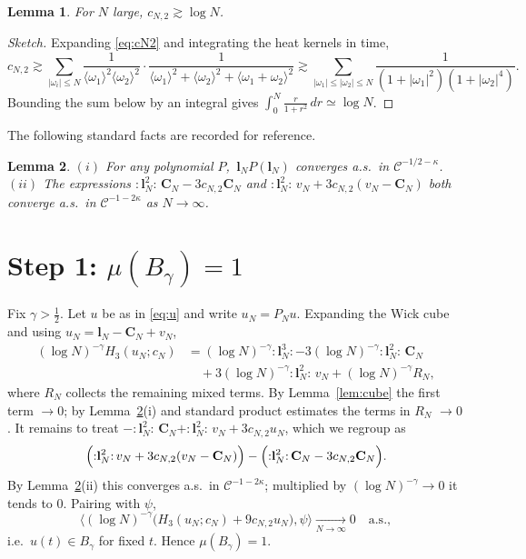 \documentclass[11pt]{article}
\newcommand{\C}{\mathcal{C}}
\newcommand{\Hp}{H}      %
\newcommand{\PN}{P_N}
\newcommand{\Lin}{\mathbf{l}}   %
\newcommand{\Iqc}{\mathbf{C}}   %
\newtheorem{lemma}{Lemma}
\begin{document}
\begin{lemma}\label{lem:logdiv}
For $N$ large, $c_{N,2}\gtrsim\log N$.
\end{lemma}

\begin{proof}[Sketch]
Expanding \eqref{eq:cN2} and integrating the heat kernels in time,
\[
c_{N,2}\gtrsim\sum_{|\omega_i|\le N}\frac{1}{\langle\omega_1\rangle^2\langle\omega_2\rangle^2}\cdot\frac{1}{\langle\omega_1\rangle^2+\langle\omega_2\rangle^2+\langle\omega_1+\omega_2\rangle^2}
\gtrsim\sum_{|\omega_1|\le|\omega_2|\le N}\frac{1}{(1+|\omega_1|^2)(1+|\omega_2|^4)}.
\]
Bounding the sum below by an integral gives
$\int_0^N\frac{r}{1+r^2}\,dr\simeq\log N$.
\end{proof}

The following standard facts are recorded for reference.

\begin{lemma}\label{lem:std}
$(i)$ For any polynomial $P$, $\,\Lin_N P(\Lin_N)$ converges a.s.\ in
$\C^{-1/2-\kappa}$. $(ii)$ The expressions ${:}\Lin_N^2{:}\,\Iqc_N-3c_{N,2}\Iqc_N$
and ${:}\Lin_N^2{:}\,v_N+3c_{N,2}(v_N-\Iqc_N)$ both converge a.s.\ in
$\C^{-1-2\kappa}$ as $N\to\infty$.
\end{lemma}

\section*{Step 1: $\mu(B_\gamma)=1$}

Fix $\gamma>\tfrac12$. Let $u$ be as in \eqref{eq:u} and write $u_N=\PN u$.
Expanding the Wick cube and using $u_N=\Lin_N-\Iqc_N+v_N$,
\begin{align*}
(\log N)^{-\gamma}\Hp_3(u_N;c_N)
&=(\log N)^{-\gamma}{:}\Lin_N^3{:}
-3(\log N)^{-\gamma}{:}\Lin_N^2{:}\,\Iqc_N\\
&\quad+3(\log N)^{-\gamma}{:}\Lin_N^2{:}\,v_N
+(\log N)^{-\gamma}R_N,
\end{align*}
where $R_N$ collects the remaining mixed terms. By Lemma~\ref{lem:cube} the
first term $\to0$; by Lemma~\ref{lem:std}(i) and standard product estimates the
terms in $R_N$ $\to0$. It remains to treat
$-{:}\Lin_N^2{:}\,\Iqc_N+{:}\Lin_N^2{:}\,v_N+3c_{N,2}u_N$, which we regroup as
\[
\Bigl({:}\Lin_N^2{:}\,v_N+3c_{N,2}(v_N-\Iqc_N)\Bigr)-\Bigl({:}\Lin_N^2{:}\,\Iqc_N-3c_{N,2}\Iqc_N\Bigr).
\]
By Lemma~\ref{lem:std}(ii) this converges a.s.\ in $\C^{-1-2\kappa}$; multiplied
by $(\log N)^{-\gamma}\to0$ it tends to $0$. Pairing with $\psi$,
\[
\bigl\langle(\log N)^{-\gamma}\bigl(\Hp_3(u_N;c_N)+9c_{N,2}u_N\bigr),\psi\bigr\rangle\xrightarrow[N\to\infty]{}0\quad\text{a.s.},
\]
i.e.\ $u(t)\in B_\gamma$ for fixed $t$. Hence $\mu(B_\gamma)=1$.
\end{document}
